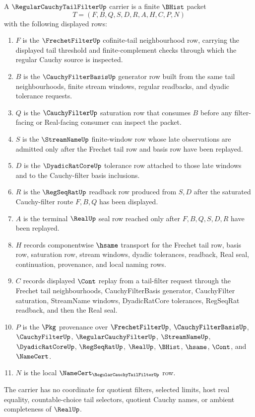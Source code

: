 \begin{definition}
\label{def:regular-cauchy-tail-filter-carrier}
A $\RegularCauchyTailFilterUp$ carrier is a finite $\BHist$ packet
$$
T=(F,B,Q,S,D,R,A,H,C,P,N)
$$
with the following displayed rows:
\begin{enumerate}
\item $F$ is the $\FrechetFilterUp$ cofinite-tail neighbourhood row, carrying the displayed tail threshold and finite-complement checks through which the regular Cauchy source is inspected.
\item $B$ is the $\CauchyFilterBasisUp$ generator row built from the same tail neighbourhoods, finite stream windows, regular readbacks, and dyadic tolerance requests.
\item $Q$ is the $\CauchyFilterUp$ saturation row that consumes $B$ before any filter-facing or Real-facing consumer can inspect the packet.
\item $S$ is the $\StreamNameUp$ finite-window row whose late observations are admitted only after the Frechet tail row and basis row have been replayed.
\item $D$ is the $\DyadicRatCoreUp$ tolerance row attached to those late windows and to the Cauchy-filter basis inclusions.
\item $R$ is the $\RegSeqRatUp$ readback row produced from $S,D$ after the saturated Cauchy-filter route $F,B,Q$ has been displayed.
\item $A$ is the terminal $\RealUp$ seal row reached only after $F,B,Q,S,D,R$ have been replayed.
\item $H$ records componentwise $\hsame$ transport for the Frechet tail row, basis row, saturation row, stream windows, dyadic tolerances, readback, Real seal, continuation, provenance, and local naming rows.
\item $C$ records displayed $\Cont$ replay from a tail-filter request through the Frechet tail neighbourhoods, CauchyFilterBasis generator, CauchyFilter saturation, StreamName windows, DyadicRatCore tolerances, RegSeqRat readback, and then the Real seal.
\item $P$ is the $\Pkg$ provenance over $\FrechetFilterUp$, $\CauchyFilterBasisUp$, $\CauchyFilterUp$, $\RegularCauchyFilterUp$, $\StreamNameUp$, $\DyadicRatCoreUp$, $\RegSeqRatUp$, $\RealUp$, $\BHist$, $\hsame$, $\Cont$, and $\NameCert$.
\item $N$ is the local $\NameCert_{\RegularCauchyTailFilterUp}$ row.
\end{enumerate}
The carrier has no coordinate for quotient filters, selected limits, host real equality, countable-choice tail selectors, quotient Cauchy names, or ambient completeness of $\RealUp$.
\end{definition}

